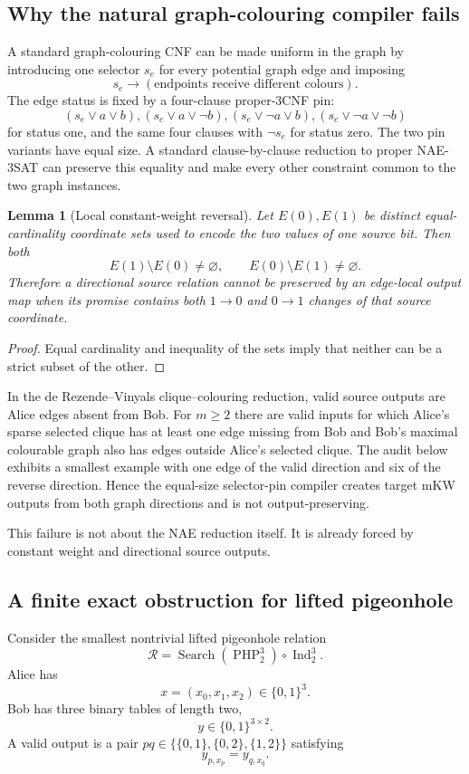 \documentclass[11pt]{article}
\newtheorem{lemma}[theorem]{Lemma}
\begin{document}
\subsection{Why the natural graph-colouring compiler fails}
A standard graph-colouring CNF can be made uniform in the graph by introducing one selector $s_e$ for every potential graph edge and imposing
\[
s_e\to(\text{endpoints receive different colours}).
\]
The edge status is fixed by a four-clause proper-3CNF pin:
\[
(s_e\vee a\vee b),(s_e\vee a\vee\neg b),
(s_e\vee\neg a\vee b),(s_e\vee\neg a\vee\neg b)
\]
for status one, and the same four clauses with $\neg s_e$ for status zero. The two pin variants have equal size. A standard clause-by-clause reduction to proper NAE-3SAT can preserve this equality and make every other constraint common to the two graph instances.

\begin{lemma}[Local constant-weight reversal]
Let $E(0),E(1)$ be distinct equal-cardinality coordinate sets used to encode the two values of one source bit. Then both
\[
E(1)\setminus E(0)\ne\varnothing,\qquad
E(0)\setminus E(1)\ne\varnothing.
\]
Therefore a directional source relation cannot be preserved by an edge-local output map when its promise contains both $1\to0$ and $0\to1$ changes of that source coordinate.
\end{lemma}
\begin{proof}
Equal cardinality and inequality of the sets imply that neither can be a strict subset of the other.
\end{proof}

In the de Rezende--Vinyals clique--colouring reduction, valid source outputs are Alice edges absent from Bob. For $m\ge2$ there are valid inputs for which Alice's sparse selected clique has at least one edge missing from Bob and Bob's maximal colourable graph also has edges outside Alice's selected clique. The audit below exhibits a smallest example with one edge of the valid direction and six of the reverse direction. Hence the equal-size selector-pin compiler creates target mKW outputs from both graph directions and is not output-preserving.

This failure is not about the NAE reduction itself. It is already forced by constant weight and directional source outputs.

\subsection{A finite exact obstruction for lifted pigeonhole}
Consider the smallest nontrivial lifted pigeonhole relation
\[
\mathcal R=\operatorname{Search}(\operatorname{PHP}_2^3)\circ\operatorname{Ind}_2^3.
\]
Alice has
\[
x=(x_0,x_1,x_2)\in\{0,1\}^3.
\]
Bob has three binary tables of length two,
\[
y\in\{0,1\}^{3\times2}.
\]
A valid output is a pair $pq\in\{\{0,1\},\{0,2\},\{1,2\}\}$ satisfying
\[
y_{p,x_p}=y_{q,x_q}.
\]
\end{document}
